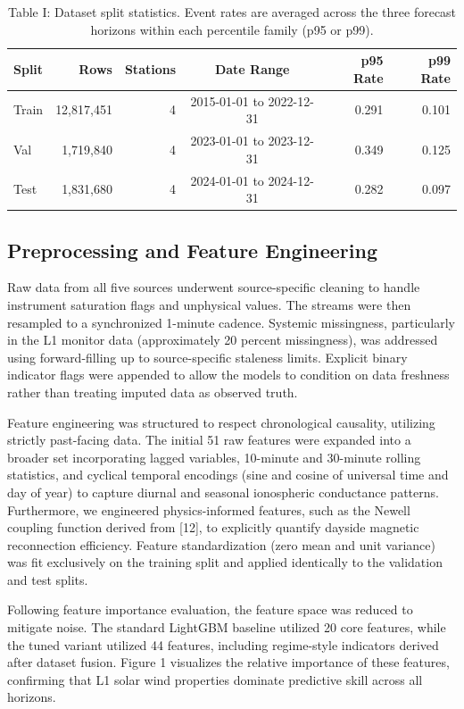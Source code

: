 \documentclass[conference]{IEEEtran}
\begin{document}
\begin{table}[htbp]
\caption{Table I: Dataset split statistics. Event rates are averaged across the three forecast horizons within each percentile family (p95 or p99).}
\centering
\begin{tabular}{lrrcrr}
\toprule
Split & Rows & Stations & Date Range & p95 Rate & p99 Rate \\
\midrule
Train & 12,817,451 & 4 & 2015-01-01 to 2022-12-31 & 0.291 & 0.101 \\
Val & 1,719,840 & 4 & 2023-01-01 to 2023-12-31 & 0.349 & 0.125 \\
Test & 1,831,680 & 4 & 2024-01-01 to 2024-12-31 & 0.282 & 0.097 \\
\bottomrule
\end{tabular}
\end{table}

\subsection{Preprocessing and Feature Engineering}
Raw data from all five sources underwent source-specific cleaning to handle instrument saturation flags and unphysical values. The streams were then resampled to a synchronized 1-minute cadence. Systemic missingness, particularly in the L1 monitor data (approximately 20 percent missingness), was addressed using forward-filling up to source-specific staleness limits. Explicit binary indicator flags were appended to allow the models to condition on data freshness rather than treating imputed data as observed truth.

Feature engineering was structured to respect chronological causality, utilizing strictly past-facing data. The initial 51 raw features were expanded into a broader set incorporating lagged variables, 10-minute and 30-minute rolling statistics, and cyclical temporal encodings (sine and cosine of universal time and day of year) to capture diurnal and seasonal ionospheric conductance patterns. Furthermore, we engineered physics-informed features, such as the Newell coupling function derived from [12], to explicitly quantify dayside magnetic reconnection efficiency. Feature standardization (zero mean and unit variance) was fit exclusively on the training split and applied identically to the validation and test splits.

Following feature importance evaluation, the feature space was reduced to mitigate noise. The standard LightGBM baseline utilized 20 core features, while the tuned variant utilized 44 features, including regime-style indicators derived after dataset fusion. Figure 1 visualizes the relative importance of these features, confirming that L1 solar wind properties dominate predictive skill across all horizons.
\end{document}
